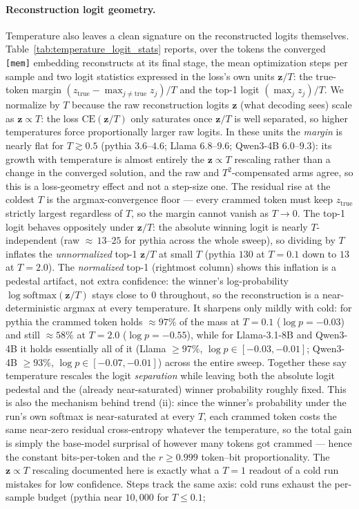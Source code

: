 \paragraph{Reconstruction logit geometry.} Temperature also leaves a clean signature on the reconstructed logits themselves. Table~\ref{tab:temperature_logit_stats} reports, over the tokens the converged \texttt{[mem]} embedding reconstructs at its final stage, the mean optimization steps per sample and two logit statistics expressed in the loss's own units $\mathbf{z}/T$: the true-token margin $(z_{\text{true}}-\max_{j\neq\text{true}} z_j)/T$ and the top-1 logit $(\max_j z_j)/T$. We normalize by $T$ because the raw reconstruction logits $\mathbf{z}$ (what decoding sees) scale as $\mathbf{z}\propto T$: the loss $\mathrm{CE}(\mathbf{z}/T)$ only saturates once $\mathbf{z}/T$ is well separated, so higher temperatures force proportionally larger raw logits. In these units the \emph{margin} is nearly flat for $T\gtrsim 0.5$ (pythia $3.6$--$4.6$; Llama $6.8$--$9.6$; Qwen3-4B $6.0$--$9.3$): its growth with temperature is almost entirely the $\mathbf{z}\propto T$ rescaling rather than a change in the converged solution, and the raw and $T^2$-compensated arms agree, so this is a loss-geometry effect and not a step-size one. The residual rise at the coldest $T$ is the argmax-convergence floor --- every crammed token must keep $z_{\text{true}}$ strictly largest regardless of $T$, so the margin cannot vanish as $T\to 0$. The top-1 logit behaves oppositely under $\mathbf{z}/T$: the absolute winning logit is nearly $T$-independent (raw ${\approx}\,13$--$25$ for pythia across the whole sweep), so dividing by $T$ inflates the \emph{unnormalized} top-1 $\mathbf{z}/T$ at small $T$ (pythia $130$ at $T{=}0.1$ down to $13$ at $T{=}2.0$). The \emph{normalized} top-1 (rightmost column) shows this inflation is a pedestal artifact, not extra confidence: the winner's log-probability $\log\mathrm{softmax}(\mathbf{z}/T)$ stays close to $0$ throughout, so the reconstruction is a near-deterministic argmax at every temperature. It sharpens only mildly with cold: for pythia the crammed token holds ${\approx}97\%$ of the mass at $T{=}0.1$ ($\log p{=}-0.03$) and still ${\approx}58\%$ at $T{=}2.0$ ($\log p{=}-0.55$), while for Llama-3.1-8B and Qwen3-4B it holds essentially all of it (Llama $\ge 97\%$, $\log p\in[-0.03,-0.01]$; Qwen3-4B $\ge 93\%$, $\log p\in[-0.07,-0.01]$) across the entire sweep. Together these say temperature rescales the logit \emph{separation} while leaving both the absolute logit pedestal and the (already near-saturated) winner probability roughly fixed. This is also the mechanism behind trend (ii): since the winner's probability under the run's own softmax is near-saturated at every $T$, each crammed token costs the same near-zero residual cross-entropy whatever the temperature, so the total gain is simply the base-model surprisal of however many tokens got crammed --- hence the constant bits-per-token and the $r\ge0.999$ token--bit proportionality. The $\mathbf{z}\propto T$ rescaling documented here is exactly what a $T{=}1$ readout of a cold run mistakes for low confidence. Steps track the same axis: cold runs exhaust the per-sample budget (pythia near $10{,}000$ for $T\le 0.1$; 
